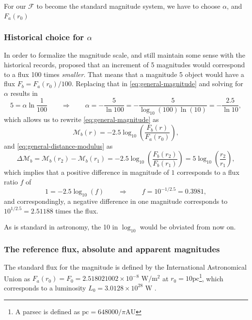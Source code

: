 	For our $\mathcal{F}$ to become the standard magnitude system, we have to choose $\alpha$, and $F_a(r_0)$
	
	\subsubsection{Historical choice for $\alpha$}
	
	In order to formalize the magnitude scale, and still maintain some sense with the historical records, 
	\cite{Pogson1856} proposed that an increment of 5 magnitudes would correspond to a flux 100 times \textit{smaller}. 
	That means that a magnitude 5 object would have a flux $F_b = F_a(r_0)/100$. 
	Replacing that in \autoref{eq:general-magnitude} and solving for $\alpha$ results in
	$$
	5 = \alpha \ln\frac{1}{100} \qquad \Rightarrow \qquad \alpha  = -\frac{5}{\ln 100} = -\frac{5}{\log_{10}(100)\ln(10)} = -\frac{2.5}{\ln 10},
	$$
	which allows us to rewrite \autoref{eq:general-magnitude} as 
	\begin{equation}
		\mathcal{M}_b(r) = -2.5 \log_{10}\left(\frac{F_b(r)}{F_a(r_0)}\right), \label{eq:magnitude}
	\end{equation}
	and \autoref{eq:general-distance-modulus} as
	\begin{equation}
		\Delta\mathcal{M}_b = \mathcal{M}_b(r_2) - \mathcal{M}_b(r_1) 
			= -2.5\log_{10}\left(\frac{F_b(r_2)}{F_b(r_1)}\right) 
			=  5 \log_{10}\left(\frac{r_2}{r_1}\right),
		\label{eq:magnitude-delta}
	\end{equation}
	which implies that a positive difference in magnitude of $1$ corresponds to a flux ratio $f$ of
	$$
		1 = -2.5 \log_{10}(f) \qquad \Rightarrow \qquad f = 10^{-1/2.5} = 0.3981,
	$$
	and correspondingly, a negative difference in one magnitude corresponds to $10^{1/2.5}=2.51188$ times the flux.
	
	As is standard in astronomy, the 10 in $\log_10$ would be obviated from now on.
	
	\subsubsection{The reference flux, absolute and apparent magnitudes}
	
	The standard flux for the magnitude is defined by the International Astronomical Union as
	$F_a(r_0)=F_0= 2.518 021 002 \times 10^{-8}\text{ W}/\text{m}^2$ at $r_0=10\text{pc}$\;\footnote{A parsec is defined as $\text{pc}=648 000/\pi \text{AU}$}, 
	which corresponds to a luminosity $L_0=3.0128\times 10^{28} \text{ W}$ \citep[IAU, B2]{IAUB22015}. 
	
